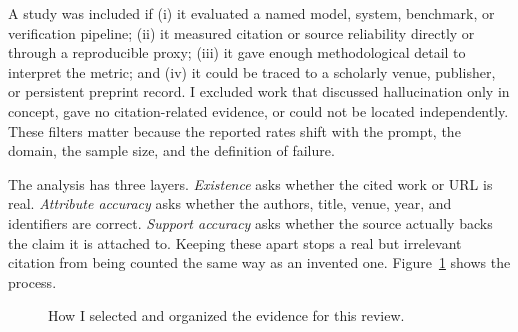 \documentclass[acmsmall,screen]{acmart}
\begin{document}
A study was included if (i) it evaluated a named model, system, benchmark, or verification pipeline; (ii) it measured citation or source reliability directly or through a reproducible proxy; (iii) it gave enough methodological detail to interpret the metric; and (iv) it could be traced to a scholarly venue, publisher, or persistent preprint record. I excluded work that discussed hallucination only in concept, gave no citation-related evidence, or could not be located independently. These filters matter because the reported rates shift with the prompt, the domain, the sample size, and the definition of failure.

The analysis has three layers. \emph{Existence} asks whether the cited work or URL is real. \emph{Attribute accuracy} asks whether the authors, title, venue, year, and identifiers are correct. \emph{Support accuracy} asks whether the source actually backs the claim it is attached to. Keeping these apart stops a real but irrelevant citation from being counted the same way as an invented one. Figure~\ref{fig:review-workflow} shows the process.

\begin{figure}[t]
\centering
{}
\caption{How I selected and organized the evidence for this review.}
\label{fig:review-workflow}
\end{figure}
\end{document}
